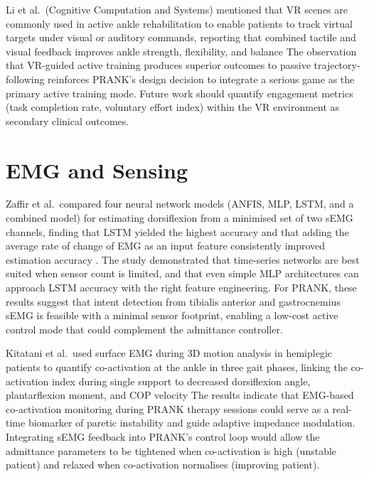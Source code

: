 Li et al.\ (Cognitive Computation and Systems) mentioned that VR scenes are commonly used in active ankle rehabilitation to enable patients to track virtual targets under visual or auditory commands, reporting that combined tactile and visual feedback improves ankle strength, flexibility, and balance %
The observation that VR-guided active training produces superior outcomes to passive trajectory-following reinforces PRANK's design decision to integrate a serious game as the primary active training mode.
Future work should quantify engagement metrics (task completion rate, voluntary effort index) within the VR environment as secondary clinical outcomes.

\section{EMG and Sensing}

Zaffir et al.\ compared four neural network models (ANFIS, MLP, LSTM, and a combined model) for estimating dorsiflexion from a minimised set of two sEMG channels, finding that LSTM yielded the highest accuracy and that adding the average rate of change of EMG as an input feature consistently improved estimation accuracy \cite{zhang2021emg}.
The study demonstrated that time-series networks are best suited when sensor count is limited, and that even simple MLP architectures can approach LSTM accuracy with the right feature engineering.
For PRANK, these results suggest that intent detection from tibialis anterior and gastrocnemius sEMG is feasible with a minimal sensor footprint, enabling a low-cost active control mode that could complement the admittance controller.

Kitatani et al.\ used surface EMG during 3D motion analysis in hemiplegic patients to quantify co-activation at the ankle in three gait phases, linking the co-activation index during single support to decreased dorsiflexion angle, plantarflexion moment, and COP velocity %
The results indicate that EMG-based co-activation monitoring during PRANK therapy sessions could serve as a real-time biomarker of paretic instability and guide adaptive impedance modulation.
Integrating sEMG feedback into PRANK's control loop would allow the admittance parameters to be tightened when co-activation is high (unstable patient) and relaxed when co-activation normalises (improving patient).

